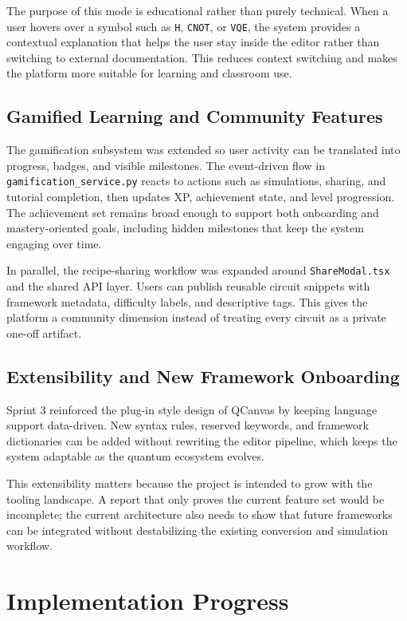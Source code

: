 The purpose of this mode is educational rather than purely technical. When a user hovers over a symbol such as \texttt{H}, \texttt{CNOT}, or \texttt{VQE}, the system provides a contextual explanation that helps the user stay inside the editor rather than switching to external documentation. This reduces context switching and makes the platform more suitable for learning and classroom use.

\subsection{Gamified Learning and Community Features}

The gamification subsystem was extended so user activity can be translated into progress, badges, and visible milestones. The event-driven flow in \texttt{gamification\_service.py} reacts to actions such as simulations, sharing, and tutorial completion, then updates XP, achievement state, and level progression. The achievement set remains broad enough to support both onboarding and mastery-oriented goals, including hidden milestones that keep the system engaging over time.

In parallel, the recipe-sharing workflow was expanded around \texttt{ShareModal.tsx} and the shared API layer. Users can publish reusable circuit snippets with framework metadata, difficulty labels, and descriptive tags. This gives the platform a community dimension instead of treating every circuit as a private one-off artifact.

\subsection{Extensibility and New Framework Onboarding}

Sprint 3 reinforced the plug-in style design of QCanvas by keeping language support data-driven. New syntax rules, reserved keywords, and framework dictionaries can be added without rewriting the editor pipeline, which keeps the system adaptable as the quantum ecosystem evolves.

This extensibility matters because the project is intended to grow with the tooling landscape. A report that only proves the current feature set would be incomplete; the current architecture also needs to show that future frameworks can be integrated without destabilizing the existing conversion and simulation workflow.

\section{Implementation Progress}

